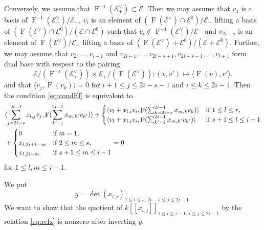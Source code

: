 \documentclass[12pt,a4paper]{article}
\DeclareMathOperator{\oF}{F}
\newcommand{\cE}{\mathcal{E}}
\begin{document}
Conversely, we assume that 
$\oF^{-1}(\cE_+^{\vee}) \subset \cE$. 
Then we may assume that 
$v_1$ is a basis of $\oF^{-1}(\cE_+^{\vee})/\cE_-$, 
$v_i$ is an element of $(\oF (\cE^{\vee}) \cap \cE^0)/\cE_-$ 
lifting a basis of 
$(\oF (\cE^{\vee}) \cap \cE^0)/(\cE \cap \cE^0)$ 
such that $v_i \notin \oF^{-1}(\cE_+^{\vee})/\cE_-$ 
and 
$v_{2i-s}$ is an element of 
$\oF (\cE^{\vee})/\cE_-$ lifting a basis of 
$(\oF (\cE^{\vee}) + \cE^0)/(\cE + \cE^0)$. 
Further, we may assume that 
$v_2,\ldots,v_{i-1}$ and 
$v_{2i-1}, \ldots , v_{2i-s+1}, v_{2i-s-1},\ldots , v_{i+1}$ 
form dual base with respect to the pairing 
\[
 \cE/(\oF^{-1}(\cE_+^{\vee})) \times \cE_+/(\oF (\cE^{\vee})); (v,v') \mapsto 
 \langle \oF (v),v' \rangle . 
\] 
and that $\langle v_j,\oF (v_k) \rangle=0$ 
for $i+1 \leq j \leq 2i-s-1$ and $i \leq k \leq 2i-1$. 
Then the condition \eqref{eq:condEf} is equivalent to 
\begin{align}
 &\langle \sum_{j=2i-s}^{2i-1} x_{l,j} v_j, \oF (\sum_{k'=i}^{2i-1} x_{m,k'} v_{k'}) \rangle + 
 \begin{cases}
 \langle v_l +x_{l,i} v_i, \oF (\sum_{k=2i-s}^{2i-1} x_{m,k}v_k ) \rangle & \textrm{if $1 \leq l \leq r$,} \\
 \langle v_l +x_{l,i} v_i, \oF (\sum_{k'=i}^{2i-1} x_{m,k'}v_{k'} ) \rangle & \textrm{if $s+1 \leq l \leq i-1$}
 \end{cases} \notag \\
 &+
 \begin{cases}
 0 & \textrm{if $m=1$,}\\
 x_{l,2i+1-m} & \textrm{if $2 \leq m \leq s$,}\\
 x_{l,2i-m} & \textrm{if $s+1 \leq m \leq i-1$} 
 \end{cases} =0 \label{eq:relx} 
\end{align}
for $1 \leq l,m \leq i-1$. 

We put 
\[
 y=\det (x_{l,j})_{1 \leq l \leq s,\, 2i-s \leq j \leq 2i-1}. 
\]
We want to show that the quotient of 
$k[[x_{l,j}]]_{1 \leq l \leq i-1,\, i \leq j \leq 2i-1}$ 
by the relation \eqref{eq:relx} is nonzero after inverting $y$. 
\end{document}
